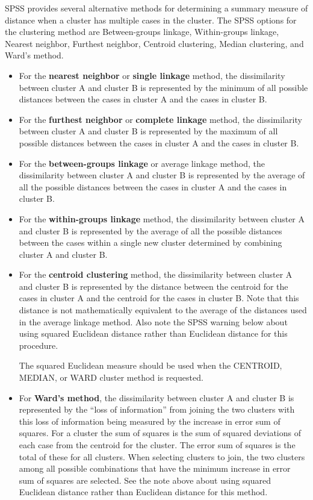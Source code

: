 \documentclass[a4paper,12pt]{article}
\begin{document}
SPSS provides several alternative methods for determining a summary measure of distance when a cluster has multiple cases in the cluster.  The SPSS options for the clustering method are Between-groups linkage, Within-groups linkage, Nearest neighbor, Furthest neighbor, Centroid clustering, Median clustering, and Ward's method.

\begin{itemize}
\item For the \textbf{nearest neighbor} or \textbf{single linkage} method, the dissimilarity between cluster A and cluster B is represented by the minimum of all possible distances between the cases in cluster A and the cases in cluster B.

\item For the \textbf{furthest neighbor} or \textbf{complete linkage} method, the dissimilarity between cluster A and cluster B is represented by the maximum of all possible distances between the cases in cluster A and the cases in cluster B.

\item For the \textbf{between-groups linkage} or average linkage method, the dissimilarity between cluster A and cluster B is represented by the average of all the possible distances between the cases in cluster A and the cases in cluster B.

\item For the \textbf{within-groups linkage} method, the dissimilarity between cluster A and cluster B is represented by the average of all the possible distances between the cases within a single new cluster determined by combining cluster A and cluster B.
 
\item  
For the \textbf{centroid clustering} method, the dissimilarity between cluster A and cluster B is represented by the distance between the centroid for the cases in cluster A and the centroid for the cases in cluster B.  Note that this distance is not mathematically equivalent to the average of the distances used in the average linkage method.  Also note the SPSS warning below about using squared Euclidean distance rather than Euclidean distance for this procedure.

\begin{framed}
The squared Euclidean measure should be used when the CENTROID, MEDIAN, or WARD cluster method is requested.
\end{framed}

\item For \textbf{Ward’s method}, the dissimilarity between cluster A and cluster B is represented by the “loss of information” from joining the two clusters with this loss of information being measured by the increase in error sum of squares.  For a cluster the sum of squares is the sum of squared deviations of each case from the centroid for the cluster.  The error sum of squares is the total of these for all clusters.  When selecting clusters to join, the two clusters among all possible combinations that have the minimum increase in error sum of squares are selected.  See the note above about using squared Euclidean distance rather than Euclidean distance for this method.


\end{itemize}
\end{document}
